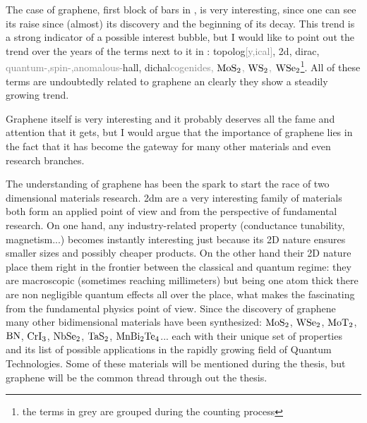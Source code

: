 The case of graphene, first block of bars in , is very interesting, since one can see its raise since (almost) its discovery and the beginning of its decay. This trend is a strong indicator of a possible interest bubble, but I would like to point out the trend over the years of the terms next to it in : topolog\textcolor{gray}{[y,ical]}, 2d, dirac, \textcolor{gray}{quantum-,spin-,anomalous-}hall, dichal\textcolor{gray}{cogenides, $\ce{MoS2}$, $\ce{WS2}$, $\ce{WSe2}$}\footnote{the terms in grey are grouped during the counting process}.
All of these terms are undoubtedly related to graphene an clearly they show a steadily growing trend.
\medskip

Graphene itself is very interesting and it probably deserves all the fame and attention that it gets, but I would argue that the importance of graphene lies in the fact that it has become the gateway for many other materials and even research branches.

The understanding of graphene has been the spark to start the race of two dimensional materials research. \ac{2dm} are a very interesting family of materials both form an applied point of view and from the perspective of fundamental research.
On one hand, any industry-related property (conductance tunability, magnetism...) becomes instantly interesting just because its 2D nature ensures smaller sizes and possibly cheaper products.
On the other hand their 2D nature place them right in the frontier between the classical and quantum regime: they are macroscopic (sometimes reaching millimeters) but being one atom thick there are non negligible quantum effects all over the place, what makes the fascinating from the fundamental physics point of view.
Since the discovery of graphene many other bidimensional materials have been synthesized: $\ce{MoS2}$, $\ce{WSe2}$, $\ce{MoT2}$, $\ce{BN}$, $\ce{CrI3}$, $\ce{NbSe2}$, $\ce{TaS2}$, $\ce{MnBi2Te4}$... each with their unique set of properties and its list of possible applications in the rapidly growing field of Quantum Technologies. %
Some of these materials will be mentioned during the thesis, but graphene will be the common thread through out the thesis.




